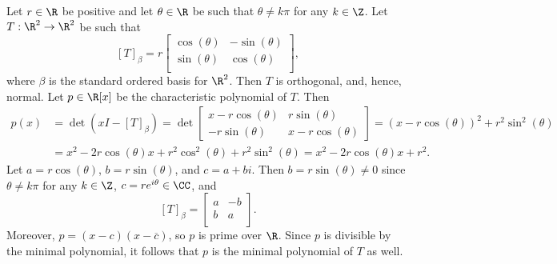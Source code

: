 \documentclass[linearalgebraII]{subfiles}
\begin{document}
    \begin{example}
        Let $r\in\R$ be positive and let $\theta\in\R$ be such that $\theta\neq k\pi$ for any $k\in\Z$. Let $T:\R^2\to\R^2$ be such that
        \begin{equation*}
            \left[ T \right] _\beta = r 
            \begin{bmatrix}
                \cos(\theta) & - \sin(\theta) \\
                \sin(\theta) & \cos(\theta) \\
            \end{bmatrix},
        \end{equation*}
        where $\beta$ is the standard ordered basis for $\R^2$. Then $T$ is orthogonal, and, hence, normal. Let $p\in\R[x]$ be the characteristic polynomial of $T$. Then
        \begin{align*}
            p(x) & = \det\left( xI-\left[ T \right] _\beta \right) = \det\begin{bmatrix} x-r\cos(\theta) & r\sin(\theta) \\ -r\sin(\theta) & x-r\cos(\theta) \end{bmatrix} = \left( x-r\cos(\theta) \right) ^2 + r^{2} \sin^{2} (\theta) \\
            & = x^2 - 2r\cos(\theta)x + r^{2} \cos^{2} (\theta) + r^{2}\sin^2(\theta) = x^2-2r\cos(\theta)x+r^2.
        \end{align*} 
        Let $a=r\cos(\theta)$, $b=r\sin(\theta)$, and $c=a+bi$. Then $b=r\sin(\theta)\neq 0$ since $\theta\neq k\pi$ for any $k\in\Z$, $c=re^{i\theta}\in\CC$, and
        \begin{equation*}
            \left[ T \right] _\beta = 
            \begin{bmatrix}
                a & -b\\
                b & a\\
            \end{bmatrix}.
        \end{equation*}
        Moreover, $p=(x-c)(x-\overline{c} )$, so $p$ is prime over $\R$. Since $p$ is divisible by the minimal polynomial, it follows that $p$ is the minimal polynomial of $T$ as well.
    \end{example}
\end{document}

